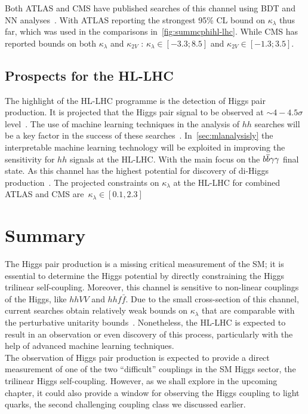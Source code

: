 Both ATLAS and CMS have published searches of this channel using  BDT and NN analyses~\cite{ATLAS:2021jki,CMS:2020tkr}. With ATLAS reporting the strongest 95\% CL bound on $\kappa_\lambda$ thus far, which was used in the comparisons in~\autoref{fig:summcphihl-lhc}. While CMS has reported bounds on both $\kappa_\lambda$ and $\kappa_{2V}$ : $\kappa_{\lambda} \in [-3.3;8.5]$ and $\kappa_{2V} \in [-1.3; 3.5]$.                                                                                       
\subsection{Prospects for the HL-LHC}
The highlight of the HL-LHC programme is the detection of Higgs pair production. It is projected that the Higgs pair signal to be observed at $\sim  4- 4.5\sigma $ level~\cite{DiMicco:2019ngk}. The use of machine learning techniques in the analysis of $hh$ searches will be a key factor in the success of these searches~\cite{Cepeda:2019klc}. In~\autoref{sec:mlanalysisly} the interpretable machine learning technology will be exploited in improving the sensitivity for $hh$ signals at the HL-LHC. With the main focus on the $b\overline b\gamma\gamma$ final state. As this channel has the highest potential for discovery of di-Higgs production~\cite{Azatov:2015oxa, Baur:2003gp, Baglio:2012np, Kling:2016lay, Barger:2013jfa, Adhikary:2017jtu, Alves:2017ued}. The projected constraints on $\kappa_\lambda$ at the HL-LHC for combined ATLAS and CMS are~$\kappa_{\lambda} \in [0.1,2.3]$~\cite{DiMicco:2019ngk,Cepeda:2019klc}

\section{Summary \label{summtrilinear}  }
The Higgs pair production is a missing critical measurement of the SM; it is essential to determine the Higgs potential by directly constraining the Higgs trilinear self-coupling. Moreover, this channel is sensitive to non-linear couplings of the Higgs, like $hhVV$ and $hh f\bar f$. Due to the small cross-section of this channel, current searches obtain relatively weak bounds on $\kappa_{\lambda}$ that are comparable with the perturbative unitarity bounds~\cite{DiLuzio:2017tfn}. Nonetheless, the HL-LHC is expected to result in an observation or even discovery of this process, particularly with the help of advanced machine learning techniques.\\ The observation of Higgs pair production is expected to provide a direct measurement of one of the two ``difficult'' couplings in the SM Higgs sector,  the trilinear Higgs self-coupling. However, as we shall explore in the upcoming chapter, it could also provide a window for observing the Higgs coupling to light quarks, the second challenging coupling class we discussed earlier.
